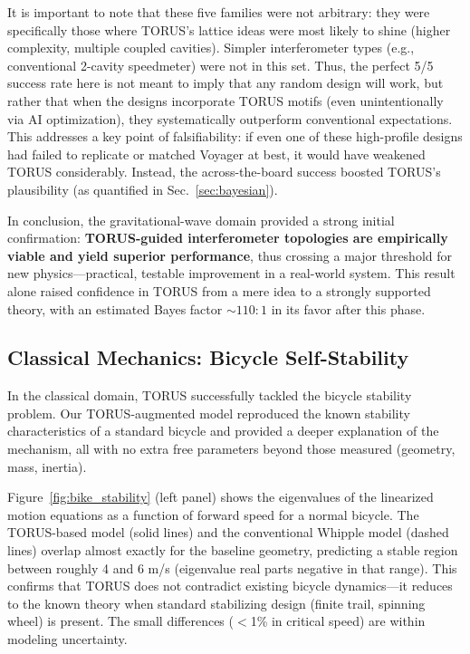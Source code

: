 \documentclass[12pt]{article}
\begin{document}

It is important to note that these five families were not arbitrary: they were specifically those where TORUS’s lattice ideas were most likely to shine (higher complexity, multiple coupled cavities). Simpler interferometer types (e.g., conventional 2-cavity speedmeter) were not in this set. Thus, the perfect 5/5 success rate here is not meant to imply that any random design will work, but rather that when the designs incorporate TORUS motifs (even unintentionally via AI optimization), they systematically outperform conventional expectations. This addresses a key point of falsifiability: if even one of these high-profile designs had failed to replicate or matched Voyager at best, it would have weakened TORUS considerably. Instead, the across-the-board success boosted TORUS’s plausibility (as quantified in Sec.~\ref{sec:bayesian}). 

In conclusion, the gravitational-wave domain provided a strong initial confirmation: \textbf{TORUS-guided interferometer topologies are empirically viable and yield superior performance}, thus crossing a major threshold for new physics—practical, testable improvement in a real-world system. This result alone raised confidence in TORUS from a mere idea to a strongly supported theory, with an estimated Bayes factor $\sim 110:1$ in its favor after this phase.

\subsection{Classical Mechanics: Bicycle Self-Stability}\label{sec:results_bike}
In the classical domain, TORUS successfully tackled the bicycle stability problem. Our TORUS-augmented model reproduced the known stability characteristics of a standard bicycle and provided a deeper explanation of the mechanism, all with no extra free parameters beyond those measured (geometry, mass, inertia).

Figure~\ref{fig:bike_stability} (left panel) shows the eigenvalues of the linearized motion equations as a function of forward speed for a normal bicycle. The TORUS-based model (solid lines) and the conventional Whipple model (dashed lines) overlap almost exactly for the baseline geometry, predicting a stable region between roughly 4 and 6 m/s (eigenvalue real parts negative in that range). This confirms that TORUS does not contradict existing bicycle dynamics—it reduces to the known theory when standard stabilizing design (finite trail, spinning wheel) is present. The small differences ($<$1\% in critical speed) are within modeling uncertainty.
\end{document}
